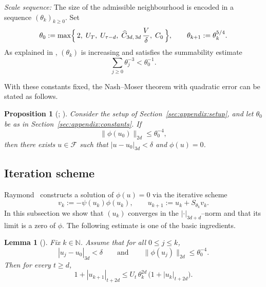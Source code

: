 \documentclass[11pt]{amsart}
\newcommand{\F}{\mathcal{F}}
\newtheorem{proposition}[theorem]{Proposition}
\newtheorem{lemma}[theorem]{Lemma}
\begin{document}
\medskip
\noindent
\textit{Scale sequence:}
The size of the admissible neighbourhood is encoded in a sequence $(\theta_k)_{k\ge 0}$.
Set
\[
\theta_0 := \max\Bigl\{\,2,\; U_T,\; U_{\tau-d},\; \widehat{C}_{3d,\,3d}\,\frac{V}{\delta},\; C_0\,\Bigr\},
\qquad
\theta_{k+1} := \theta_k^{5/4}.
\]
As explained in \cite{Raymond1989}, $(\theta_k)$ is increasing and satisfies the summability estimate
\[
\sum_{j\ge 0}\theta_j^{-3} < \theta_0^{-1}.
\]

\medskip
\noindent
With these constants fixed, the Nash--Moser theorem with quadratic error can be stated as follows.

\begin{proposition}[{\cite[Main theorem]{Raymond1989}; \cite[Theorem~A.11]{DonaldsonLehmann2024}}]
	\label{prop:explicit-nash-moser}
	Consider the setup of Section~\ref{sec:appendix:setup}, and let $\theta_0$ be as in
	Section~\ref{sec:appendix:constants}. If
	\[
	\|\phi(u_0)\|_{2d} \le \theta_0^{-4},
	\]
	then there exists $u\in \F$ such that $|u-u_0|_{3d}<\delta$ and $\phi(u)=0$.
\end{proposition}

\subsection{Iteration scheme}
Raymond~\cite{Raymond1989} constructs a solution of $\phi(u)=0$ via the iterative scheme
\begin{equation}\label{eq:raymond-iteration}
	v_k := -\psi(u_k)\phi(u_k),
	\qquad
	u_{k+1} := u_k + S_{\theta_k} v_k .
\end{equation}
In this subsection we show that $(u_k)$ converges in the $|\cdot|_{3d+d}$--norm and that its limit
is a zero of $\phi$.  The following estimate is one of the basic ingredients.

\begin{lemma}[{\cite[Lemma~1(iii)]{Raymond1989}}]
	\label{lem:property-3-Raymond}
	Fix $k\in \mathbb{N}$. Assume that for all $0\le j\le k$,
	\[
	|u_j-u_0|_{3d}<\delta
	\qquad\text{and}\qquad
	\|\phi(u_j)\|_{2d}\le \theta_0^{-4}.
	\]
	Then for every $t\ge d$,
	\[
	1+|u_{k+1}|_{t+2d}
	\le U_t\,\theta_k^{2d}\,\bigl(1+|u_k|_{t+2d}\bigr).
	\]
\end{lemma}
\end{document}
